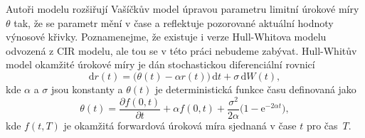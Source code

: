 \documentclass[a4paper,12pt]{report}
\theoremstyle{definition} \newtheorem{definice}[veta]{Definice}
\theoremstyle{remark}
\begin{document}

Autoři modelu rozšiřují Vašíčkův model úpravou parametru limitní úrokové míry $\theta$ tak, že se parametr mění v čase a reflektuje pozorované aktuální hodnoty výnosové křivky.
Poznamenejme, že existuje i verze Hull-Whitova modelu odvozená z CIR modelu, ale tou se v této práci nebudeme zabývat.
Hull-Whitův model okamžité úrokové míry je dán stochastickou diferenciální rovnicí
\begin{equation}\label{H-W_model}
 \mathrm{d}r(t)=\big(\theta(t)-\alpha r(t)\big)\,\mathrm{d}t+\sigma\,\mathrm{d}W(t),
\end{equation}
kde $\alpha$ a $\sigma$ jsou konstanty a $\theta(t)$ je deterministická funkce času definovaná jako
\begin{equation}
\theta(t)=\frac{\partial  f(0,t)}{\partial t}+\alpha f(0,t)+\frac{\sigma^2}{2 \alpha}\big(1-\mathrm{e}^{-2\alpha t}\big),
\end{equation}
kde $f(t,T)$ je okamžitá forwardová úroková míra sjednaná v čase $t$ pro čas~$T$.
\end{document}

